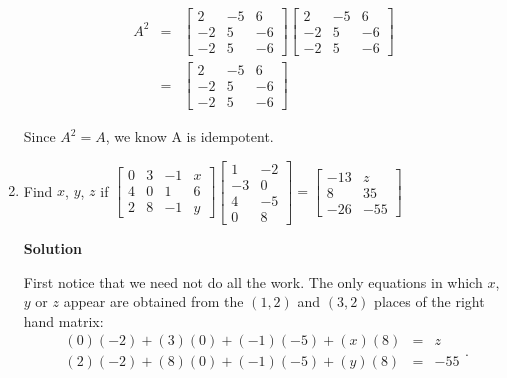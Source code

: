 \begin{enumerate}
\begin{eqnarray*} A^{2}
&=&\left[ \begin{array}{rrr}
                           2&-5&6\\
                           -2&5&-6\\
                           -2&5&-6\end{array} \right]
\left[ \begin{array}{rrr}
                           2&-5&6\\
                           -2&5&-6\\
                           -2&5&-6\end{array} \right]\\
&=&\left[ \begin{array}{rrr}
                           2&-5&6\\
                           -2&5&-6\\
                           -2&5&-6\end{array} \right]
\end{eqnarray*}

\noindent Since $A^{2}=A$, we know A is idempotent.

\item Find $x$, $y$, $z$ if $\left [ \begin{array}{rrrr}
0&3&-1&x\\ 4&0&1&6 \\ 2&8&-1&y \end{array} \right ] \left [
\begin{array}{rr} 1&-2\\-3&0\\4&-5\\0&8 \end{array} \right ]=\left [
\begin{array}{rr} -13&z\\8&35\\-26&-55 \end{array} \right ]$

\noindent \textbf{Solution}

\noindent First notice that we need not do all the work. The only
equations in which $x$,$y$ or $z$ appear are obtained from the
$(1,2)$ and $(3,2)$ places of the right hand matrix:
$$\begin{array}{rcl} (0)(-2)+(3)(0)+(-1)(-5)+(x)(8)&=&z \\
                     (2)(-2)+(8)(0)+(-1)(-5)+(y)(8)&=&-55 \end{array}.$$


\end{enumerate}
